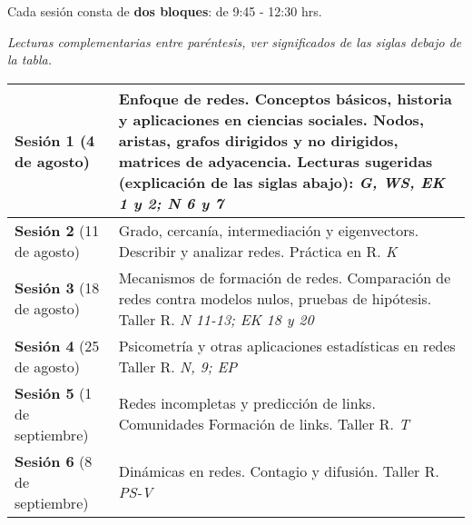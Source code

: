 \documentclass[12pt]{article}
\begin{document}
Cada sesión consta de \textbf{dos bloques}: de 9:45 - 12:30 hrs. 

\textit{Lecturas complementarias entre paréntesis, ver significados de las siglas debajo de la tabla.}

\vspace{0.5cm}

\begin{longtable}{|p{4cm}|p{11cm}|}
\hline
\textbf{Sesión 1} \newline (4 de agosto) & 
Enfoque de redes. Conceptos básicos, historia y aplicaciones en ciencias sociales. Nodos, aristas, grafos dirigidos y no dirigidos, matrices de adyacencia. 
\newline \newline 
Lecturas sugeridas (explicación de las siglas abajo): 
\newline \newline 
\textit{G, WS, EK 1 y 2; N 6 y 7} \\
\hline
\textbf{Sesión 2} \newline (11 de agosto) &
Grado, cercanía, intermediación y eigenvectors. Describir y analizar redes. 
\newline Práctica en R.
\newline \newline 
\textit{K} \\
\hline
\textbf{Sesión 3} \newline (18 de agosto) &
Mecanismos de formación de redes. Comparación de redes contra modelos nulos, pruebas de hipótesis. 
\newline Taller R.
\newline \newline 
\textit{N 11-13; EK 18 y 20} \\
\hline
\textbf{Sesión 4} \newline (25 de agosto) &
Psicometría y otras aplicaciones estadísticas en redes 
\newline Taller R.
\newline \newline 
\textit{N, 9; EP} \\
\hline
\textbf{Sesión 5} \newline (1 de septiembre) &
Redes incompletas y predicción de links. Comunidades Formación de links.  
\newline Taller R.
\newline \newline
\textit{T} \\
\hline
\textbf{Sesión 6} \newline (8 de septiembre) &
Dinámicas en redes. Contagio y difusión. 
\newline Taller R. 
\newline \newline 
\textit{PS-V} \\
\hline
\end{longtable}
\end{document}
